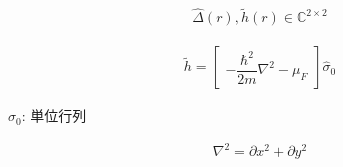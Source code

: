 \documentclass{jarticle}
\begin{document}
\begin{align}
\hat{\Delta}(r),\tilde{h}(r)\in\mathbb{C}^{2\times 2}
\end{align}

\begin{align}
\tilde{h}=
\begin{bmatrix}
-\dfrac{\hbar^2}{2m}\nabla^2-\mu_F
\end{bmatrix}
\hat{\sigma}_0
\end{align}

\begin{flushright}
$\hat{\sigma}_0$: 単位行列
\end{flushright}
\begin{align}
\nabla^2=\partial x^2+\partial y^2
\end{align}
\end{document}
